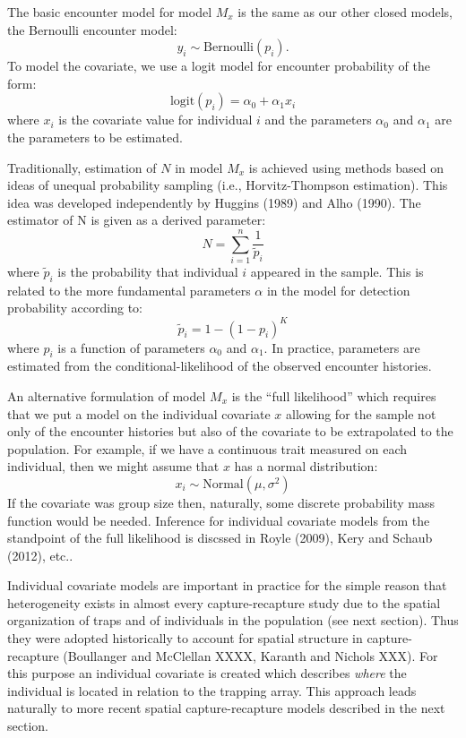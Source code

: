 \documentclass{book}
\begin{document}
The basic encounter model for model $M_x$ is the same as our other
closed models, the Bernoulli encounter model:
\[
y_{i} \sim \mbox{Bernoulli}(p_{i}).
\]
To model the covariate, we use a logit model for encounter probability
of the form:
\begin{equation}
 \mbox{logit}(p_{i}) = \alpha_0 + \alpha_1 x_{i}
\end{equation}
where $x_i$ is the covariate value for individual $i$ and the
parameters $\alpha_0$ and $\alpha_1$ are the parameters to be
estimated.

Traditionally, estimation of $N$ in model $M_{x}$ is
achieved using methods based on ideas of unequal probability sampling
(i.e., Horvitz-Thompson estimation). This idea was developed
independently by Huggins (1989) and Alho (1990). The estimator of N is
given as a derived parameter:
\[
\hat{N} = \sum_{i=1}^{n} \frac{1}{\tilde{p}_{i}}
\]
where $\tilde{p}_{i}$ is the probability that individual $i$ appeared
in the sample.   This is related to the more fundamental parameters
$\alpha$ in the model for detection probability according to:
\[
\tilde{p}_{i}  = 1- (1-p_{i})^K
\]
where $p_{i}$ is a function of parameters $\alpha_{0}$ and $\alpha_{1}$.
In practice, parameters are
estimated from the conditional-likelihood of the observed encounter
histories.

An alternative formulation of model $M_x$ is the ``full likelihood''
which requires that we put a model on the individual covariate $x$
allowing for the sample not only of the encounter histories but also
of the covariate to be extrapolated to the population.
 For example, if we have a continuous trait measured on
each individual, then we might assume that $x$ has a normal distribution:
\[
x_{i} \sim \mbox{Normal}(\mu,\sigma^{2})
\]
If the covariate was group size then, naturally, some discrete
probability mass function would be needed. Inference for individual
covariate models from the standpoint of the  full likelihood is
discssed in Royle (2009), Kery and Schaub (2012), etc..

Individual covariate models are important in practice for the simple
reason that heterogeneity exists in almost every capture-recapture
study due to the spatial organization of traps and of individuals in
the population (see next section). Thus they were adopted historically
to account for spatial structure in capture-recapture
(Boullanger and McClellan XXXX, Karanth and Nichols XXX).
For this purpose an individual covariate is created which
describes {\it where} the individual is located in relation to the
trapping array.  This approach leads naturally to more recent spatial
capture-recapture models described in the next section.
\end{document}
